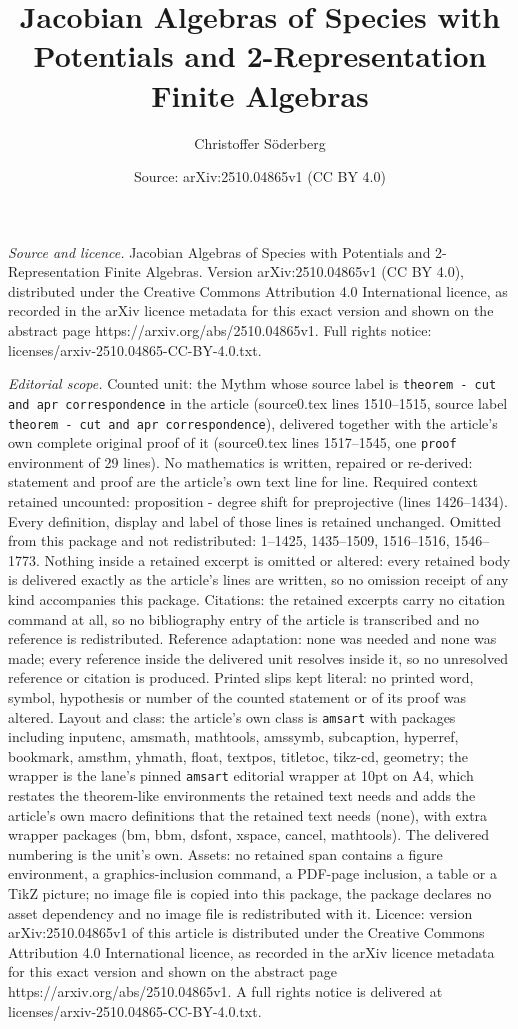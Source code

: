 \documentclass[10pt,a4paper]{amsart}
\title[Jacobian Algebras of Species with Potentials and 2-Represent]{Jacobian Algebras of Species with Potentials and 2-Representation Finite Algebras}
\author{Christoffer S\"oderberg}
\date{Source: arXiv:2510.04865v1 (CC BY 4.0)}
\begin{document}
\maketitle

\noindent\emph{Source and licence.} Jacobian Algebras of Species with Potentials and 2-Representation Finite Algebras. Version arXiv:2510.04865v1 (CC BY 4.0), distributed under the Creative Commons Attribution 4.0 International licence, as recorded in the arXiv licence metadata for this exact version and shown on the abstract page https://arxiv.org/abs/2510.04865v1. Full rights notice: licenses/arxiv-2510.04865-CC-BY-4.0.txt.\par\smallskip

\noindent\textit{Editorial scope.} Counted unit: the Mythm whose source label is \texttt{theorem - cut and apr correspondence} in the article (source0.tex lines 1510--1515, source label \texttt{theorem - cut and apr correspondence}), delivered together with the article's own complete original proof of it (source0.tex lines 1517--1545, one \texttt{proof} environment of 29 lines). No mathematics is written, repaired or re-derived: statement and proof are the article's own text line for line. Required context retained uncounted: proposition - degree shift for preprojective (lines 1426--1434). Every definition, display and label of those lines is retained unchanged. Omitted from this package and not redistributed: 1--1425, 1435--1509, 1516--1516, 1546--1773. Nothing inside a retained excerpt is omitted or altered: every retained body is delivered exactly as the article's lines are written, so no omission receipt of any kind accompanies this package. Citations: the retained excerpts carry no citation command at all, so no bibliography entry of the article is transcribed and no reference is redistributed. Reference adaptation: none was needed and none was made; every reference inside the delivered unit resolves inside it, so no unresolved reference or citation is produced. Printed slips kept literal: no printed word, symbol, hypothesis or number of the counted statement or of its proof was altered. Layout and class: the article's own class is \texttt{amsart} with packages including inputenc, amsmath, mathtools, amssymb, subcaption, hyperref, bookmark, amsthm, yhmath, float, textpos, titletoc, tikz-cd, geometry; the wrapper is the lane's pinned \texttt{amsart} editorial wrapper at 10pt on A4, which restates the theorem-like environments the retained text needs and adds the article's own macro definitions that the retained text needs (none), with extra wrapper packages (bm, bbm, dsfont, xspace, cancel, mathtools). The delivered numbering is the unit's own. Assets: no retained span contains a figure environment, a graphics-inclusion command, a PDF-page inclusion, a table or a TikZ picture; no image file is copied into this package, the package declares no asset dependency and no image file is redistributed with it. Licence: version arXiv:2510.04865v1 of this article is distributed under the Creative Commons Attribution 4.0 International licence, as recorded in the arXiv licence metadata for this exact version and shown on the abstract page https://arxiv.org/abs/2510.04865v1. A full rights notice is delivered at licenses/arxiv-2510.04865-CC-BY-4.0.txt. 
\end{document}

